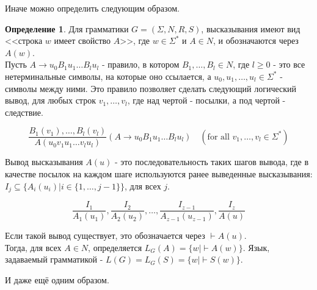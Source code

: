 \documentclass[a4paper]{article}
\theoremstyle{indented}
\theoremstyle{definition}
\newtheorem{defn}{Определение}
\theoremstyle{remark}
\DeclareMathOperator{\ra}{\rightarrow}
\begin{document}
Иначе можно определить следующим образом.

\begin{defn}
    Для грамматики $G = (\Sigma, N, R, S)$, высказывания имеют вид <<строка $w$ имеет свойство $A$>>, где $w \in \Sigma^*$ и $A \in N$, и обозначаются через $A(w)$. \\ 

    Пусть $A \ra u_0B_1u_1 \ldots B_lu_l$ - правило, в котором $B_1,\ldots,B_l \in N$, где $l \geq 0$ - это все нетерминальные символы, на которые оно ссылается, а $u_0, u_1, \ldots , u_l \in \Sigma^*$ - символы между ними. Это правило позволяет сделать следующий логический вывод, для любых строк $v_1, \ldots , v_l$, где над чертой - посылки, а под чертой - следствие. 
    
    \[
        \frac{B_1(v_1),\ldots,B_l(v_l)}{A(u_0v_1u_1 \ldots v_lu_l)} (A \ra u_0B_1u_1 \ldots B_lu_l) \; \; \: \: (\text{for all } v_1,\ldots,v_l \in \Sigma^*) 
    \]

    Вывод высказывания $A(u)$ - это последовательность таких шагов вывода, где в качестве посылок на каждом шаге используются ранее выведенные высказывания: $I_j \subseteq \{ A_i(u_i) | i \in \{1, \ldots , j - 1\} \}$, для всех $j$.
    
    \[
        \frac{I_1}{A_1(u_1)}, \frac{I_2}{A_2(u_2)}, \ldots, \frac{I_{z-1}}{A_{z-1}(u_{z-1})}, \frac{I_z}{A(u)}
    \]

    Если такой вывод существует, это обозначается через $\vdash A(u)$. \\ 

    Тогда, для всех $A \in N$, определяется $L_G(A) = \{w |\vdash A(w)\}$. Язык, задаваемый грамматикой - $L(G) = L_G(S) = \{w |\vdash S(w)\}$.
\end{defn}

И даже ещё одним образом. 
\end{document}
